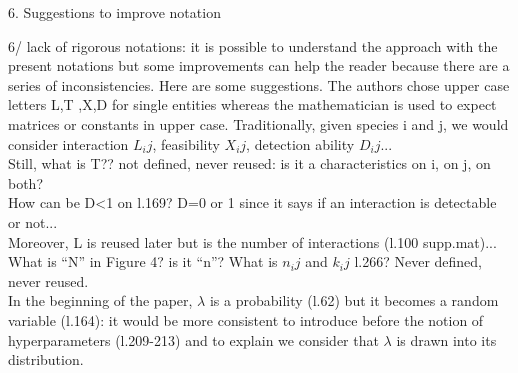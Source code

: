 \documentclass[12pt]{letter}
\newenvironment{refquote}{\bigskip \begin{it}}{\end{it}\smallskip}
\begin{document}
	6. Suggestions to improve notation 


		\begin{refquote}
			6/ lack of rigorous notations: it is possible to understand the approach with the present notations but some improvements can help the reader because there are a series of inconsistencies. Here are some suggestions. The authors chose upper case letters L,T ,X,D for single entities whereas the mathematician is used to expect matrices or constants in upper case. Traditionally, given species i and j, we would consider interaction $L_ij$, feasibility $X_ij$, detection ability $D_ij$... \\
			Still, what is T?? not defined, never reused: is it a characteristics on i, on j, on both? \\
			How can be D<1 on l.169? D=0 or 1 since it says if an interaction is detectable or not... \\
			Moreover, L is reused later but is the number of interactions (l.100 supp.mat)... \\
			What is ``N'' in Figure 4? is it ``n''? What is $n_ij$ and $k_ij$ l.266? Never defined, never reused. \\
			In the beginning of the paper, $\lambda$ is a probability (l.62) but it becomes a random variable (l.164): it would be more consistent to introduce before the notion of hyperparameters  (l.209-213) and to explain we consider that $\lambda$ is drawn into its distribution.
		\end{refquote}
\end{document}
